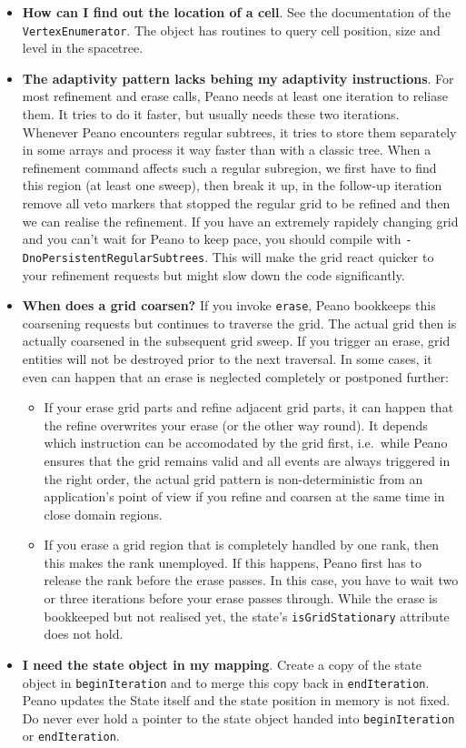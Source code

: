\begin{itemize}
  \item \textbf{ How can I find out the location of a cell}. See the
  documentation of the \texttt{VertexEnumerator}. The object has routines to query cell
  position, size and level in the spacetree.
  \item \textbf{ The adaptivity pattern lacks behing my adaptivity
  instructions}.
  For most refinement and erase calls, Peano needs at least one iteration to
  reliase them. It tries to do it faster, but usually needs these two
  iterations. Whenever Peano encounters regular subtrees, it tries to store 
  them separately in some arrays and process it way faster than with a classic
  tree. When a refinement command affects such a regular subregion, we first 
  have to find this region (at least one sweep), then break it up, in the
  follow-up iteration remove all veto markers that stopped the regular grid to
  be refined and then we can realise the refinement. If you have an extremely
  rapidely changing grid and you can't wait for Peano to keep pace, you should
  compile with \texttt{-DnoPersistentRegularSubtrees}. This will make the grid
  react quicker to your refinement requests but might slow down the code
  significantly.
  \item \textbf{ When does a grid coarsen?} If you invoke \texttt{erase}, Peano
  bookkeeps this coarsening requests but continues to traverse the grid. The
  actual grid then is actually coarsened in the subsequent grid sweep. If you
  trigger an erase, grid entities will not be destroyed prior to the next
  traversal. In some cases, it even can happen that an erase is neglected
  completely or postponed further:
  \begin{itemize}
    \item If your erase grid parts and refine adjacent grid parts, it can happen
    that the refine overwrites your erase (or the other way round). It depends
    which instruction can be accomodated by the grid first, i.e.~while Peano
    ensures that the grid remains valid and all events are always triggered in
    the right order, the actual grid pattern is non-deterministic from an
    application's point of view if you refine and coarsen at the same time in
    close domain regions.
    \item If you erase a grid region that is completely handled by one rank,
    then this makes the rank unemployed. If this happens, Peano first has to
    release the rank before the erase passes. In this case, you have to wait two
    or three iterations before your erase passes through. While the erase is
    bookkeeped but not realised yet, the state's \texttt{isGridStationary}
    attribute does not hold.
  \end{itemize}
  \item \textbf{ I need the state object in my mapping}. Create a copy of the
  state object in \texttt{beginIteration} and to merge this copy back in \texttt{endIteration}. 
  Peano updates the State itself and the state position in memory is not fixed.
  Do never ever hold a pointer to the state object handed into
  \texttt{beginIteration} or \texttt{endIteration}.
\end{itemize}


